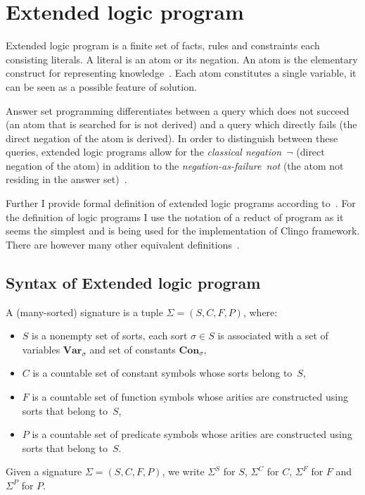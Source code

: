 \section{Extended logic program}

Extended logic program is a finite set of facts, rules and constraints
each consisting literals. A literal is an atom or its negation.
An atom is the elementary construct for representing knowledge~\cite{Delgrande}.
Each atom constitutes a single variable, it can be seen as a possible feature of solution.

Answer set programming differentiates between a query which does not succeed
(an atom that is searched for is not derived) and a query which directly fails
(the direct negation of the atom is derived).
In order to distinguish between these queries, extended logic programs allow
for the \textit{classical negation~$\neg$} (direct negation of the atom)
in addition to the \textit{negation-as-failure~not} (the atom not residing
in the answer set)~\cite{gelfond1991}.

Further I provide formal definition of extended logic programs according to~\cite{gelfond1991,KRHandbook}.
For the definition of logic programs I use the notation of a reduct of program
as it seems the simplest and is being used for the implementation of Clingo framework.
There are however many other equivalent definitions~\cite{12definitions}.

\subsection{Syntax of Extended logic program}

\begin{definition}
    A (many-sorted) signature is a tuple $\Sigma = (S, C, F, P)$, where:
    \begin{itemize}
        \item $S$ is a nonempty set of sorts, each sort $\sigma\in S$
            is associated with a set of variables $\mathbf{Var}_\sigma$ and
            set of constants $\mathbf{Con}_\sigma$,
        \item $C$ is a countable set of constant symbols whose sorts belong to~$S$,
        \item $F$ is a countable set of function symbols whose arities
            are constructed using sorts that belong to~$S$,
        \item $P$ is a countable set of predicate symbols whose arities
            are constructed using sorts that belong to~$S$.
    \end{itemize}
    Given a signature $\Sigma = (S, C, F, P)$, we write $\Sigma^{S}$ for $S$,
    $\Sigma^{C}$ for $C$, $\Sigma^{F}$ for $F$ and $\Sigma^{P}$ for $P$.
\end{definition}

